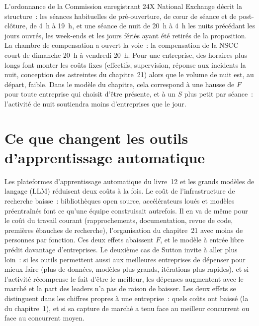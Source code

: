 L'ordonnance de la Commission enregistrant 24X National Exchange décrit la structure~: les séances habituelles de pré-ouverture, de cœur de séance et de post-clôture, de 4~h à
19~h, et une séance de nuit de 20~h à 4~h les nuits précédant les jours ouvrés, les week-ends et les jours fériés ayant été retirés de la
proposition. La chambre de compensation a ouvert la voie~: la compensation de la NSCC court de dimanche 20~h à vendredi 20~h. Pour une entreprise, des horaires plus longs font monter les coûts fixes
(effectifs, supervision, réponse aux incidents la nuit, conception des astreintes du chapitre~21) alors que le volume de nuit est, au départ, faible. Dans le
modèle du chapitre, cela correspond à une hausse de $F$ pour toute entreprise qui choisit d'être présente, et à un $S$ plus petit par séance~: l'activité de nuit
soutiendra moins d'entreprises que le jour.

\section{Ce que changent les outils d'apprentissage automatique}

Les plateformes d'apprentissage automatique du livre~12 et les grands modèles de langage (LLM) réduisent deux coûts à la fois. Le coût de l'infrastructure de recherche baisse~: bibliothèques open source,
accélérateurs loués et modèles préentraînés font ce qu'une équipe construisait autrefois. Il en va de même pour le coût du travail courant (rapprochements, documentation, revue de code,
premières ébauches de recherche), l'organisation du chapitre~21 avec moins de personnes par fonction. Ces deux effets abaissent $F$, et le modèle à entrée libre prédit davantage d'entreprises. Le deuxième cas de Sutton
invite à aller plus loin~: si les outils permettent aussi aux meilleures entreprises de dépenser pour mieux faire (plus de données, modèles plus grands, itérations plus rapides), et si
l'activité récompense le fait d'être le meilleur, les dépenses augmentent avec le marché et la part des leaders n'a pas de raison de baisser. Les deux effets se distinguent dans
les chiffres propres à une entreprise~: quels coûts ont baissé (la  du chapitre~1), et si sa capture de marché a tenu face au meilleur concurrent ou face au concurrent moyen.

